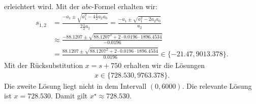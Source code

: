 erleichtert wird. Mit der $abc$-Formel erhalten wir:
\begin{align*}
	s_{1,2}
	&=
	\frac{-a_1 \pm \sqrt{a_1^2 - 4 \frac{1}{2} a_2 a_0}}{2 \frac{1}{2} a_2}
	=
	\frac{-a_1 \pm \sqrt{a_1^2 - 2  a_2 a_0}}{ a_2} \\
	&\approx
	\frac{-88.1207 \pm \sqrt{88.1207^2 + 2 \cdot 0.0196 \cdot 1896.4534}}{-0.0196}\\
	&=
	\frac{88.1207 \pm \sqrt{88.1207^2 + 2 \cdot 0.0196 \cdot 1896.4534}}{0.0196}
	\in 
	\{ -21.47, 9013.378\}.
\end{align*}
Mit der Rücksubstitution $x = s + 750$ erhalten wir die Lösungen 
\begin{align*}
	x
	\in 
	\{
	728.530,9763.378
	\}.
\end{align*}
Die zweite Lösung liegt nicht in dem Intervall $(0,6000)$. Die relevante Lösung ist $x = 728.530$. Damit gilt $x^\star \approx 728.530$.


\newpage
